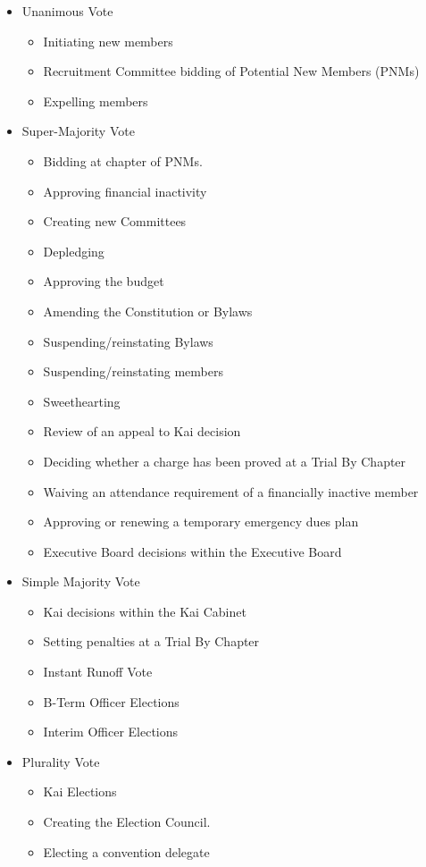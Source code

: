\begin{itemize}
	\item[] Unanimous Vote
		\begin{itemize}
			\item Initiating new members
			\item Recruitment Committee bidding of Potential New Members (PNMs)
			\item Expelling members
		\end{itemize}
	\item[] Super-Majority Vote
		\begin{itemize}
			\item Bidding at chapter of PNMs.
			\item Approving financial inactivity
			\item Creating new Committees
			\item Depledging
			\item Approving the budget
			\item Amending the Constitution or Bylaws
			\item Suspending/reinstating Bylaws
			\item Suspending/reinstating members
			\item Sweethearting
			\item Review of an appeal to Kai decision
			\item Deciding whether a charge has been proved at a Trial By
				Chapter
			\item Waiving an attendance requirement of a financially inactive
				member
			\item Approving or renewing a temporary emergency dues plan
			\item Executive Board decisions within the Executive Board
		\end{itemize}
	\item[] Simple Majority Vote
		\begin{itemize}
			\item Kai decisions within the Kai Cabinet
			\item Setting penalties at a Trial By Chapter
			\item Instant Runoff Vote
			\item B-Term Officer Elections
			\item Interim Officer Elections
		\end{itemize}
	\item[] Plurality Vote
		\begin{itemize}
			\item Kai Elections
			\item Creating the Election Council.
			\item Electing a convention delegate
		\end{itemize}
\end{itemize}

